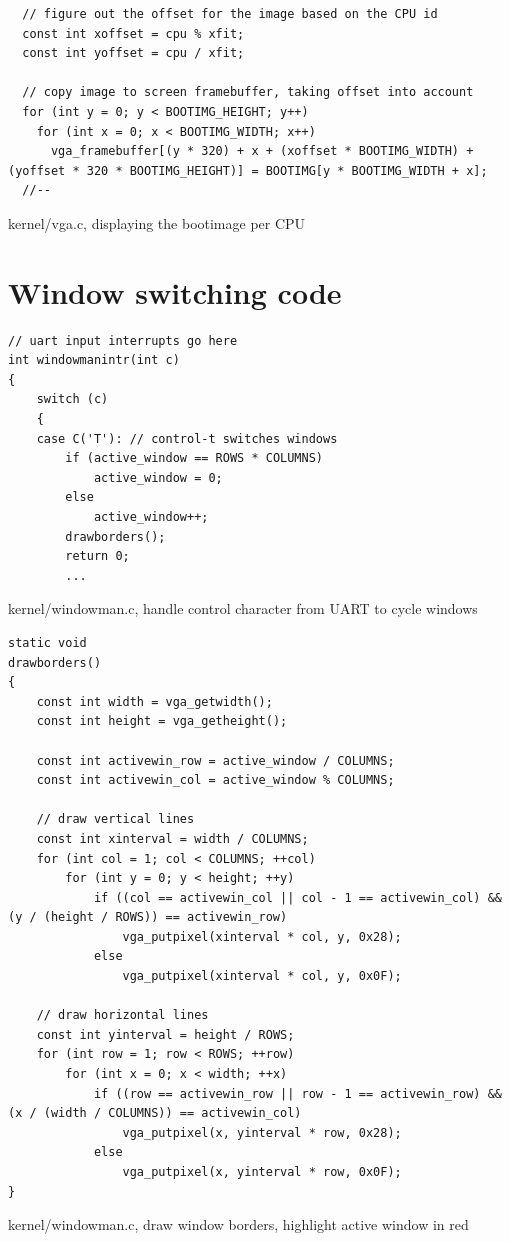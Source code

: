 \begin{appendices}
\begin{listing}[H]
\begin{verbatim}
  // figure out the offset for the image based on the CPU id
  const int xoffset = cpu % xfit;
  const int yoffset = cpu / xfit;

  // copy image to screen framebuffer, taking offset into account
  for (int y = 0; y < BOOTIMG_HEIGHT; y++)
    for (int x = 0; x < BOOTIMG_WIDTH; x++)
      vga_framebuffer[(y * 320) + x + (xoffset * BOOTIMG_WIDTH) + (yoffset * 320 * BOOTIMG_HEIGHT)] = BOOTIMG[y * BOOTIMG_WIDTH + x];
  //--
    \end{verbatim}
    \caption{kernel/vga.c, displaying the bootimage per CPU}
\end{listing}

\section{Window switching code}
\label{appendix:c:6}
\begin{listing}[H]
  \begin{verbatim}
// uart input interrupts go here
int windowmanintr(int c)
{
    switch (c)
    {
    case C('T'): // control-t switches windows
        if (active_window == ROWS * COLUMNS)
            active_window = 0;
        else
            active_window++;
        drawborders();
        return 0;
        ...
  \end{verbatim}
  \caption{kernel/windowman.c, handle control character from UART to cycle windows}
\end{listing}

\begin{listing}[H]
  \begin{verbatim}
static void
drawborders()
{
    const int width = vga_getwidth();
    const int height = vga_getheight();

    const int activewin_row = active_window / COLUMNS;
    const int activewin_col = active_window % COLUMNS;

    // draw vertical lines
    const int xinterval = width / COLUMNS;
    for (int col = 1; col < COLUMNS; ++col)
        for (int y = 0; y < height; ++y)
            if ((col == activewin_col || col - 1 == activewin_col) && (y / (height / ROWS)) == activewin_row)
                vga_putpixel(xinterval * col, y, 0x28);
            else
                vga_putpixel(xinterval * col, y, 0x0F);

    // draw horizontal lines
    const int yinterval = height / ROWS;
    for (int row = 1; row < ROWS; ++row)
        for (int x = 0; x < width; ++x)
            if ((row == activewin_row || row - 1 == activewin_row) && (x / (width / COLUMNS)) == activewin_col)
                vga_putpixel(x, yinterval * row, 0x28);
            else
                vga_putpixel(x, yinterval * row, 0x0F);
}
  \end{verbatim}
  \caption{kernel/windowman.c, draw window borders, highlight active window in red}
\end{listing}


\end{appendices}
